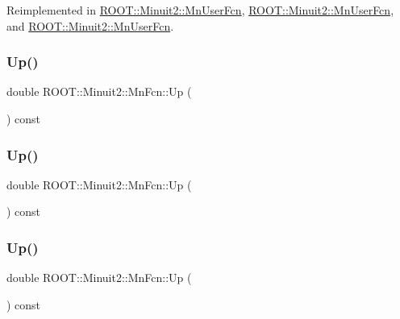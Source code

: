 Reimplemented in \mbox{\hyperlink{classROOT_1_1Minuit2_1_1MnUserFcn_a7f25ae05f1caca57bd8d1e83b9643dfe}{R\+O\+O\+T\+::\+Minuit2\+::\+Mn\+User\+Fcn}}, \mbox{\hyperlink{classROOT_1_1Minuit2_1_1MnUserFcn_aad007634c740a70ebb8f5acb0a7cfede}{R\+O\+O\+T\+::\+Minuit2\+::\+Mn\+User\+Fcn}}, and \mbox{\hyperlink{classROOT_1_1Minuit2_1_1MnUserFcn_aad007634c740a70ebb8f5acb0a7cfede}{R\+O\+O\+T\+::\+Minuit2\+::\+Mn\+User\+Fcn}}.

\mbox{\label{classROOT_1_1Minuit2_1_1MnFcn_a2c91d0dd77e9c913116fb84b6fe31633}} 
\subsubsection{\texorpdfstring{Up()}{Up()}\hspace{0.1cm}{\footnotesize\ttfamily [1/3]}}
{\footnotesize\ttfamily double R\+O\+O\+T\+::\+Minuit2\+::\+Mn\+Fcn\+::\+Up (\begin{DoxyParamCaption}{ }\end{DoxyParamCaption}) const}

\mbox{\label{classROOT_1_1Minuit2_1_1MnFcn_a2c91d0dd77e9c913116fb84b6fe31633}} 
\subsubsection{\texorpdfstring{Up()}{Up()}\hspace{0.1cm}{\footnotesize\ttfamily [2/3]}}
{\footnotesize\ttfamily double R\+O\+O\+T\+::\+Minuit2\+::\+Mn\+Fcn\+::\+Up (\begin{DoxyParamCaption}{ }\end{DoxyParamCaption}) const}

\mbox{\label{classROOT_1_1Minuit2_1_1MnFcn_a2c91d0dd77e9c913116fb84b6fe31633}} 
\subsubsection{\texorpdfstring{Up()}{Up()}\hspace{0.1cm}{\footnotesize\ttfamily [3/3]}}
{\footnotesize\ttfamily double R\+O\+O\+T\+::\+Minuit2\+::\+Mn\+Fcn\+::\+Up (\begin{DoxyParamCaption}{ }\end{DoxyParamCaption}) const}

